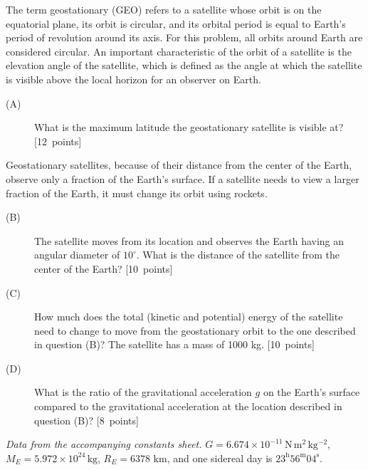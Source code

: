 The term geostationary (GEO) refers to a satellite whose orbit is on the equatorial plane, its orbit is
circular, and its orbital period is equal to Earth's period of revolution around its axis.
For this problem, all orbits around Earth are considered circular. An important characteristic of the
orbit of a satellite is the elevation angle of the satellite, which is defined as the angle at which the
satellite is visible above the local horizon for an observer on Earth.
\begin{description}
\item[(A)] What is the maximum latitude the geostationary satellite is visible at? \hfill\mbox{[12 points]}
\end{description}
Geostationary satellites, because of their distance from the center of the Earth, observe only a fraction
of the Earth's surface. If a satellite needs to view a larger fraction of the Earth, it must change its orbit using rockets.
\begin{description}
\item[(B)] The satellite moves from its location and observes the Earth having an angular diameter of $10^\circ$.
What is the distance of the satellite from the center of the Earth? \hfill\mbox{[10 points]}
\item[(C)] How much does the total (kinetic and potential) energy of the satellite need to change to move
from the geostationary orbit to the one described in question (B)? The satellite has a mass of 1000 kg. \hfill\mbox{[10 points]}
\item[(D)] What is the ratio of the gravitational acceleration $g$ on the Earth's surface compared to the
gravitational acceleration at the location described in question (B)? \hfill\mbox{[8 points]}
\end{description}
\textit{Data from the accompanying constants sheet.}
$G=6.674\times10^{-11}\,\mathrm{N\,m^2\,kg^{-2}}$, $M_E=5.972\times10^{24}\,\mathrm{kg}$,
$R_E=6378$ km, and one sidereal day is $23^{\mathrm h}56^{\mathrm m}04^{\mathrm s}$.
